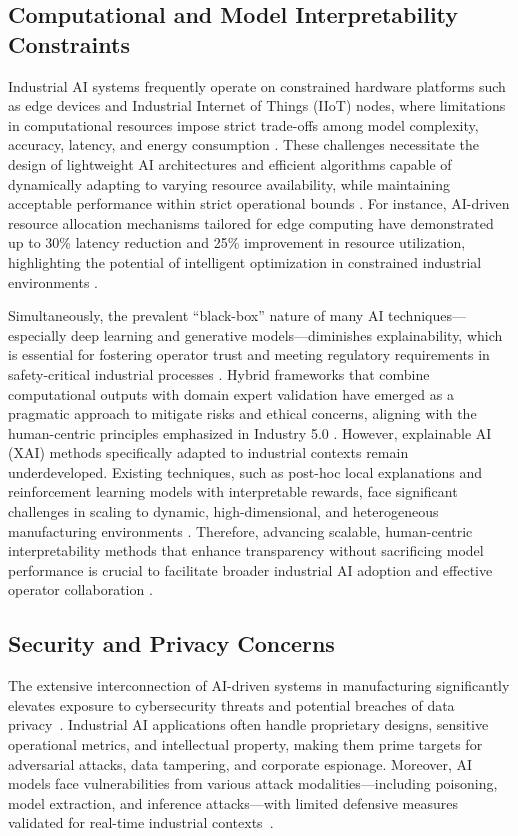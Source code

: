\documentclass[sigconf]{acmart}
\begin{document}
\subsection{Computational and Model Interpretability Constraints}

Industrial AI systems frequently operate on constrained hardware platforms such as edge devices and Industrial Internet of Things (IIoT) nodes, where limitations in computational resources impose strict trade-offs among model complexity, accuracy, latency, and energy consumption \cite{ref2,ref31}. These challenges necessitate the design of lightweight AI architectures and efficient algorithms capable of dynamically adapting to varying resource availability, while maintaining acceptable performance within strict operational bounds \cite{ref31,ref34}. For instance, AI-driven resource allocation mechanisms tailored for edge computing have demonstrated up to 30\% latency reduction and 25\% improvement in resource utilization, highlighting the potential of intelligent optimization in constrained industrial environments \cite{ref31}.

Simultaneously, the prevalent ``black-box'' nature of many AI techniques—especially deep learning and generative models—diminishes explainability, which is essential for fostering operator trust and meeting regulatory requirements in safety-critical industrial processes \cite{ref2,ref34}. Hybrid frameworks that combine computational outputs with domain expert validation have emerged as a pragmatic approach to mitigate risks and ethical concerns, aligning with the human-centric principles emphasized in Industry 5.0 \cite{ref2,ref14}. However, explainable AI (XAI) methods specifically adapted to industrial contexts remain underdeveloped. Existing techniques, such as post-hoc local explanations and reinforcement learning models with interpretable rewards, face significant challenges in scaling to dynamic, high-dimensional, and heterogeneous manufacturing environments \cite{ref14,ref36}. Therefore, advancing scalable, human-centric interpretability methods that enhance transparency without sacrificing model performance is crucial to facilitate broader industrial AI adoption and effective operator collaboration \cite{ref14}.

\subsection{Security and Privacy Concerns}

The extensive interconnection of AI-driven systems in manufacturing significantly elevates exposure to cybersecurity threats and potential breaches of data privacy~\cite{ref13,ref37}. Industrial AI applications often handle proprietary designs, sensitive operational metrics, and intellectual property, making them prime targets for adversarial attacks, data tampering, and corporate espionage. Moreover, AI models face vulnerabilities from various attack modalities—including poisoning, model extraction, and inference attacks—with limited defensive measures validated for real-time industrial contexts~\cite{ref37,ref41}.
\end{document}
